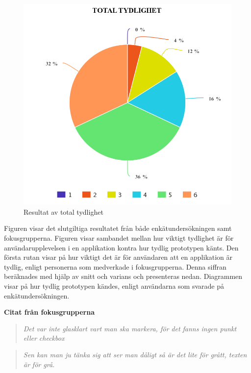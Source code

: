 \begin{figure} [H]
  \centering
  \includegraphics[scale=0.4]{meta-chart-2.png}
 \captionsetup{justification=centering,margin=2cm}
 \caption{Resultat av total tydlighet}
\end{figure} 

Figuren visar det slutgiltiga resultatet från både enkätundersökningen samt fokusgrupperna. Figuren visar sambandet mellan hur viktigt tydlighet är för användarupplevelsen i en applikation kontra hur tydlig prototypen känts. Den första rutan visar på hur viktigt det är för användaren att en applikation är tydlig, enligt personerna som medverkade i fokusgrupperna. Denna siffran beräknades med hjälp av snitt och varians och presenteras nedan. Diagrammen visar på hur tydlig prototypen kändes, enligt användarna som svarade på enkätundersökningen. 
\newline

\textbf{Citat från fokusgrupperna}
\begin{quotation}
\em Det var inte glasklart vart man ska markera, för det fanns ingen punkt eller checkbox
\end{quotation}

\begin{quotation}
\em Sen kan man ju tänka sig att ser man dåligt så är det lite för grått, texten är för grå.
\end{quotation}

